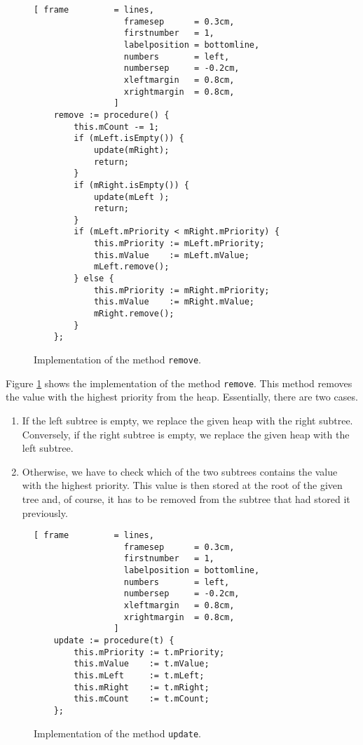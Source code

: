 \begin{figure}[!ht]
\centering
\begin{Verbatim}[ frame         = lines, 
                  framesep      = 0.3cm, 
                  firstnumber   = 1,
                  labelposition = bottomline,
                  numbers       = left,
                  numbersep     = -0.2cm,
                  xleftmargin   = 0.8cm,
                  xrightmargin  = 0.8cm,
                ]
    remove := procedure() {
        this.mCount -= 1;
        if (mLeft.isEmpty()) { 
            update(mRight); 
            return;
        } 
        if (mRight.isEmpty()) { 
            update(mLeft ); 
            return;
        }
        if (mLeft.mPriority < mRight.mPriority) {
            this.mPriority := mLeft.mPriority;
            this.mValue    := mLeft.mValue;
            mLeft.remove();
        } else {
            this.mPriority := mRight.mPriority;
            this.mValue    := mRight.mValue;
            mRight.remove();
        }
    };
\end{Verbatim}
\vspace*{-0.3cm}
\caption{Implementation of the method \texttt{remove}.}
\label{fig:heap.stlx-remove}
\end{figure}

\noindent
Figure \ref{fig:heap.stlx-remove} shows the implementation of the method \texttt{remove}.  This
method removes the value with the highest priority from the heap.  Essentially, there are two
cases.
\begin{enumerate}
\item If the left subtree is empty, we replace the given heap with the right subtree. 
      Conversely, if the right subtree is empty, we replace the given heap with the  left subtree.
\item Otherwise, we have to check which of the two subtrees contains the value with the highest
      priority.  This value is then stored at the root of the given tree and, of course,
      it has to be removed from the subtree that had stored it previously.
\end{enumerate}

\begin{figure}[!ht]
\centering
\begin{Verbatim}[ frame         = lines, 
                  framesep      = 0.3cm, 
                  firstnumber   = 1,
                  labelposition = bottomline,
                  numbers       = left,
                  numbersep     = -0.2cm,
                  xleftmargin   = 0.8cm,
                  xrightmargin  = 0.8cm,
                ]
    update := procedure(t) {
        this.mPriority := t.mPriority;
        this.mValue    := t.mValue;
        this.mLeft     := t.mLeft;
        this.mRight    := t.mRight;
        this.mCount    := t.mCount;
    };      
\end{Verbatim}
\vspace*{-0.3cm}
\caption{Implementation of the method \texttt{update}.}
\label{fig:heap.stlx-update}
\end{figure}

